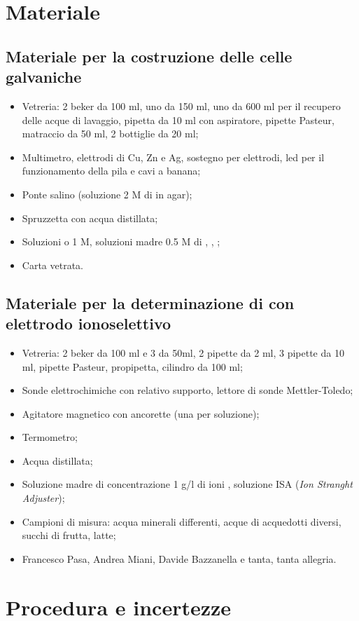 \section*{Materiale}

\subsection*{Materiale per la costruzione delle celle galvaniche}

\begin{itemize}
        \setlength{\parskip}{0pt}
        \item{Vetreria: 2 beker da 100 ml, uno da 150 ml, uno da 600 ml per il recupero delle acque di lavaggio, 
            pipetta da 10 ml con aspiratore, pipette Pasteur,
            matraccio da 50 ml, 2 bottiglie da 20 ml;}
        \item{Multimetro, elettrodi di Cu, Zn e Ag,
            sostegno per elettrodi, led per il funzionamento della pila e cavi a banana;}
        \item{Ponte salino (soluzione 2 M di  in agar);}
        \item{Spruzzetta con acqua distillata;}
        \item{Soluzioni  o  1 M, soluzioni madre 0.5 M di , , ;}
        \item{Carta vetrata.}
\end{itemize}

\subsection*{Materiale per la determinazione di  con elettrodo ionoselettivo}

\begin{itemize}
        \setlength{\parskip}{0pt}
        \item{Vetreria: 2 beker da 100 ml e 3 da 50ml, 2 pipette da 2 ml, 3 pipette da 10 ml, pipette Pasteur,
            propipetta, cilindro da 100 ml;}
        \item{Sonde elettrochimiche con relativo supporto, lettore di sonde Mettler-Toledo;}
        \item{Agitatore magnetico con ancorette (una per soluzione);}
        \item{Termometro;}
        \item{Acqua distillata;}
        \item{Soluzione madre di concentrazione 1 g/l di ioni , soluzione ISA (\emph{Ion Stranght
            Adjuster});}
        \item{Campioni di misura: acqua minerali differenti, acque di acquedotti diversi, succhi di frutta, latte;}
        \item{Francesco Pasa, Andrea Miani, Davide Bazzanella e tanta, tanta allegria.}
\end{itemize}

\section*{Procedura e incertezze}
